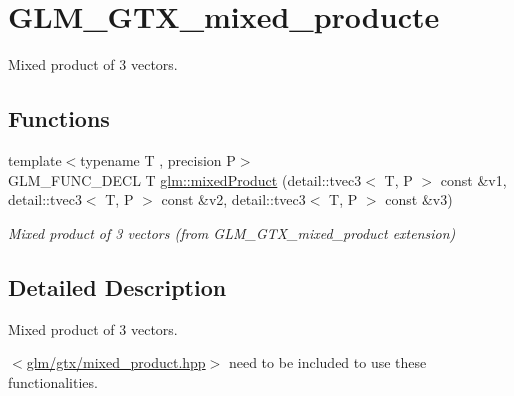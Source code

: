 \hypertarget{group__gtx__mixed__product}{}\section{G\+L\+M\+\_\+\+G\+T\+X\+\_\+mixed\+\_\+producte}
\label{group__gtx__mixed__product}


Mixed product of 3 vectors.  


\subsection*{Functions}
\begin{DoxyCompactItemize}
\item 
{\footnotesize template$<$typename T , precision P$>$ }\\G\+L\+M\+\_\+\+F\+U\+N\+C\+\_\+\+D\+E\+CL T \hyperlink{group__gtx__mixed__product_ga3c7ec94fdd2b088eac78fb4a0211f32d}{glm\+::mixed\+Product} (detail\+::tvec3$<$ T, P $>$ const \&v1, detail\+::tvec3$<$ T, P $>$ const \&v2, detail\+::tvec3$<$ T, P $>$ const \&v3)\hypertarget{group__gtx__mixed__product_ga3c7ec94fdd2b088eac78fb4a0211f32d}{}\label{group__gtx__mixed__product_ga3c7ec94fdd2b088eac78fb4a0211f32d}

\begin{DoxyCompactList}\small\item\em Mixed product of 3 vectors (from G\+L\+M\+\_\+\+G\+T\+X\+\_\+mixed\+\_\+product extension) \end{DoxyCompactList}\end{DoxyCompactItemize}


\subsection{Detailed Description}
Mixed product of 3 vectors. 

$<$\hyperlink{mixed__product_8hpp}{glm/gtx/mixed\+\_\+product.\+hpp}$>$ need to be included to use these functionalities. 